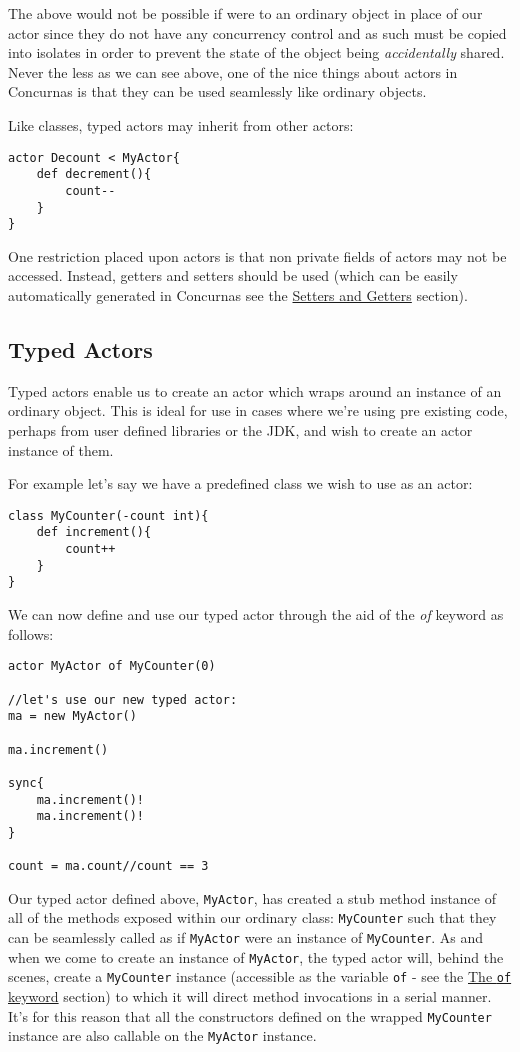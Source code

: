 \documentclass[conc-doc]{subfiles}
\begin{document}
The above would not be possible if were to an ordinary object in place of our actor since they do not have any concurrency control and as such must be copied into isolates in order to prevent the state of the object being \textit{accidentally} shared. Never the less as we can see above, one of the nice things about actors in Concurnas is that they can be used seamlessly like ordinary objects. 

Like classes, typed actors may inherit from other actors:

\begin{lstlisting}
actor Decount < MyActor{
	def decrement(){
		count--
	}
}
\end{lstlisting}

One restriction placed upon actors is that non private fields of actors may not be accessed. Instead, getters and setters should be used (which can be easily automatically generated in Concurnas see the \hyperref[sec:setandget]{Setters and Getters} section).

\subsection{Typed Actors}
\label{subsec:typedactors}
Typed actors enable us to create an actor which wraps around an instance of an ordinary object. This is ideal for use in cases where we're using pre existing code, perhaps from user defined libraries or the JDK, and wish to create an actor instance of them.

For example let's say we have a predefined class we wish to use as an actor:

\begin{lstlisting}
class MyCounter(-count int){
	def increment(){
		count++
	}
}
\end{lstlisting}

We can now define and use our typed actor through the aid of the \textit{of} keyword as follows:

\begin{lstlisting}
actor MyActor of MyCounter(0)

//let's use our new typed actor:
ma = new MyActor()

ma.increment()

sync{
	ma.increment()!
	ma.increment()!
}

count = ma.count//count == 3
\end{lstlisting}

Our typed actor defined above, \lstinline{MyActor}, has created a stub method instance of all of the methods exposed within our ordinary class: \lstinline{MyCounter} such that they can be seamlessly called as if \lstinline{MyActor} were an instance of \lstinline{MyCounter}. As and when we come to create an instance of \lstinline{MyActor}, the typed actor will, behind the scenes, create a \lstinline{MyCounter} instance (accessible as the variable \lstinline{of} - see the \hyperref[subsubsec:ofKeyword]{The \lstinline!of! keyword} section) to which it will direct method invocations in a serial manner. It's for this reason that all the constructors defined on the wrapped \lstinline{MyCounter} instance are also callable on the \lstinline{MyActor} instance.
\end{document}
